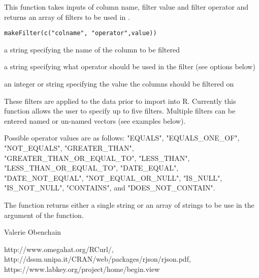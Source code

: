 \begin{Description}\relax
This function takes inputs of column name, filter value and filter operator and 
returns an array of filters to be used in .
\end{Description}
\begin{Usage}
\begin{verbatim}
makeFilter(c("colname", "operator",value))
\end{verbatim}
\end{Usage}
\begin{Arguments}
\begin{ldescription}
\item[\code{colname}] a string specifying the name of the column to be filtered
\item[\code{operator}] a string specifying what operator should be used in the filter (see options below)
\item[\code{value}] an integer or string specifying the value the columns should be filtered on
\end{ldescription}
\end{Arguments}
\begin{Details}\relax
These filters are applied to the data prior to import into R. Currently this function
allows the user to specify up to five filters. Multiple filters can be entered named or
un-named vectors (see examples below).

Possible operator values are as follows:
"EQUALS", "EQUALS\_ONE\_OF", "NOT\_EQUALS", "GREATER\_THAN", "GREATER\_THAN\_OR\_EQUAL\_TO", "LESS\_THAN",
"LESS\_THAN\_OR\_EQUAL\_TO", "DATE\_EQUAL", "DATE\_NOT\_EQUAL", "NOT\_EQUAL\_OR\_NULL",
"IS\_NULL", "IS\_NOT\_NULL", "CONTAINS", and "DOES\_NOT\_CONTAIN".
\end{Details}
\begin{Value}
The function returns either a single string or an array of strings to be use in the
 argument of the  function.
\end{Value}
\begin{Author}\relax
Valerie Obenchain
\end{Author}
\begin{References}\relax
http://www.omegahat.org/RCurl/, \\
http://dssm.unipa.it/CRAN/web/packages/rjson/rjson.pdf,\\
https://www.labkey.org/project/home/begin.view
\end{References}
